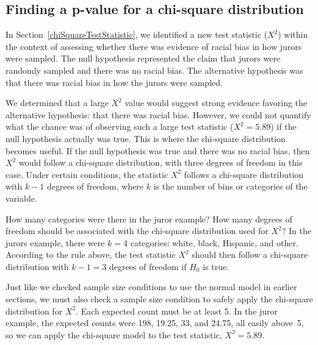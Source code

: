\subsection{Finding a p-value for a chi-square distribution}
\label{pValueForAChiSquareTest}

In Section~\ref{chiSquareTestStatistic}, we identified a new test statistic ($X^2$) within the context of assessing whether there was evidence of racial bias in how jurors were sampled. The null hypothesis represented the claim that jurors were randomly sampled and there was no racial bias. The alternative hypothesis was that there was racial bias in how the jurors were sampled.

We determined that a large $X^2$ value would suggest strong evidence favoring the alternative hypothesis: that there was racial bias. However, we could not quantify what the chance was of observing such a large test statistic ($X^2=5.89$) if the null hypothesis actually was true. This is where the chi-square distribution becomes useful. If the null hypothesis was true and there was no racial bias, then $X^2$ would follow a chi-square distribution, with three degrees of freedom in this case. Under certain conditions, the statistic $X^2$ follows a chi-square distribution with $k-1$ degrees of freedom, where $k$ is the number of bins or categories of the variable.

\begin{example}{How many categories were there in the juror example? How many degrees of freedom should be associated with the chi-square distribution used for $X^2$?}
In the jurors example, there were $k=4$ categories: white, black, Hispanic, and other. According to the rule above, the test statistic $X^2$ should then follow a chi-square distribution with $k-1 = 3$ degrees of freedom if $H_0$ is true.
\end{example}

Just like we checked sample size conditions to use the normal model in earlier sections, we must also check a sample size condition to safely apply the chi-square distribution for $X^2$. Each expected count must be at least 5. In the juror example, the expected counts were 198, 19.25, 33, and 24.75, all easily above~5, so we can apply the chi-square model to the test statistic, $X^2=5.89$.

